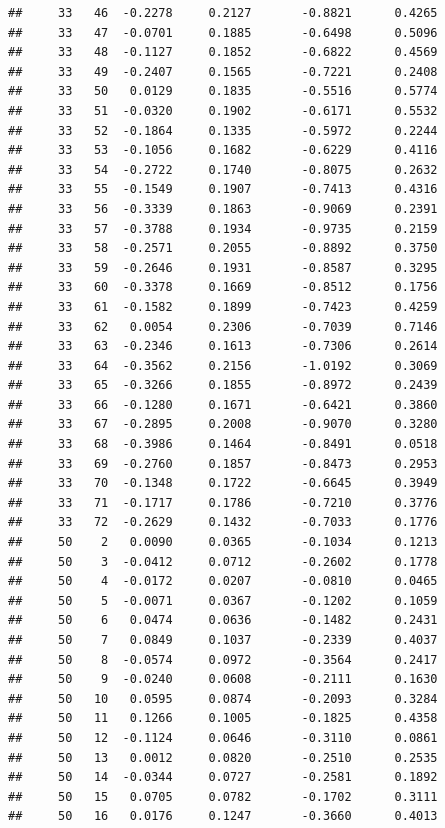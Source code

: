\documentclass[
]{article}
\begin{document}
\begin{verbatim}
##     33   46  -0.2278     0.2127       -0.8821      0.4265  
##     33   47  -0.0701     0.1885       -0.6498      0.5096  
##     33   48  -0.1127     0.1852       -0.6822      0.4569  
##     33   49  -0.2407     0.1565       -0.7221      0.2408  
##     33   50   0.0129     0.1835       -0.5516      0.5774  
##     33   51  -0.0320     0.1902       -0.6171      0.5532  
##     33   52  -0.1864     0.1335       -0.5972      0.2244  
##     33   53  -0.1056     0.1682       -0.6229      0.4116  
##     33   54  -0.2722     0.1740       -0.8075      0.2632  
##     33   55  -0.1549     0.1907       -0.7413      0.4316  
##     33   56  -0.3339     0.1863       -0.9069      0.2391  
##     33   57  -0.3788     0.1934       -0.9735      0.2159  
##     33   58  -0.2571     0.2055       -0.8892      0.3750  
##     33   59  -0.2646     0.1931       -0.8587      0.3295  
##     33   60  -0.3378     0.1669       -0.8512      0.1756  
##     33   61  -0.1582     0.1899       -0.7423      0.4259  
##     33   62   0.0054     0.2306       -0.7039      0.7146  
##     33   63  -0.2346     0.1613       -0.7306      0.2614  
##     33   64  -0.3562     0.2156       -1.0192      0.3069  
##     33   65  -0.3266     0.1855       -0.8972      0.2439  
##     33   66  -0.1280     0.1671       -0.6421      0.3860  
##     33   67  -0.2895     0.2008       -0.9070      0.3280  
##     33   68  -0.3986     0.1464       -0.8491      0.0518  
##     33   69  -0.2760     0.1857       -0.8473      0.2953  
##     33   70  -0.1348     0.1722       -0.6645      0.3949  
##     33   71  -0.1717     0.1786       -0.7210      0.3776  
##     33   72  -0.2629     0.1432       -0.7033      0.1776  
##     50    2   0.0090     0.0365       -0.1034      0.1213  
##     50    3  -0.0412     0.0712       -0.2602      0.1778  
##     50    4  -0.0172     0.0207       -0.0810      0.0465  
##     50    5  -0.0071     0.0367       -0.1202      0.1059  
##     50    6   0.0474     0.0636       -0.1482      0.2431  
##     50    7   0.0849     0.1037       -0.2339      0.4037  
##     50    8  -0.0574     0.0972       -0.3564      0.2417  
##     50    9  -0.0240     0.0608       -0.2111      0.1630  
##     50   10   0.0595     0.0874       -0.2093      0.3284  
##     50   11   0.1266     0.1005       -0.1825      0.4358  
##     50   12  -0.1124     0.0646       -0.3110      0.0861  
##     50   13   0.0012     0.0820       -0.2510      0.2535  
##     50   14  -0.0344     0.0727       -0.2581      0.1892  
##     50   15   0.0705     0.0782       -0.1702      0.3111  
##     50   16   0.0176     0.1247       -0.3660      0.4013  

\end{verbatim}
\end{document}

